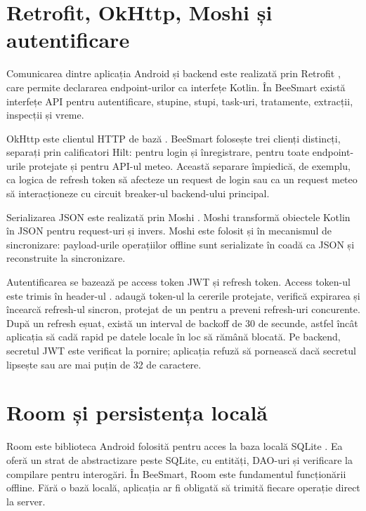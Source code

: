 \section{Retrofit, OkHttp, Moshi și autentificare}

Comunicarea dintre aplicația Android și backend este realizată prin Retrofit \cite{retrofitDocs}, care permite declararea endpoint-urilor ca interfețe Kotlin. În BeeSmart există interfețe API pentru autentificare, stupine, stupi, task-uri, tratamente, extracții, inspecții și vreme.

OkHttp este clientul HTTP de bază \cite{okhttpDocs}. BeeSmart folosește trei clienți distincți, separați prin calificatori Hilt:  pentru login și înregistrare,  pentru toate endpoint-urile protejate și  pentru API-ul meteo. Această separare împiedică, de exemplu, ca logica de refresh token să afecteze un request de login sau ca un request meteo să interacționeze cu circuit breaker-ul backend-ului principal.

Serializarea JSON este realizată prin Moshi \cite{moshiDocs}. Moshi transformă obiectele Kotlin în JSON pentru request-uri și invers. Moshi este folosit și în mecanismul de sincronizare: payload-urile operațiilor offline sunt serializate în coadă ca JSON și reconstruite la sincronizare.

Autentificarea se bazează pe access token JWT și refresh token. Access token-ul este trimis în header-ul  \cite{jwtRfc}.  adaugă token-ul la cererile protejate, verifică expirarea și încearcă refresh-ul sincron, protejat de un  pentru a preveni refresh-uri concurente. După un refresh eșuat, există un interval de backoff de 30 de secunde, astfel încât aplicația să cadă rapid pe datele locale în loc să rămână blocată. Pe backend, secretul JWT este verificat la pornire; aplicația refuză să pornească dacă secretul lipsește sau are mai puțin de 32 de caractere.

\section{Room și persistența locală}

Room este biblioteca Android folosită pentru acces la baza locală SQLite \cite{androidRoomDocs}. Ea oferă un strat de abstractizare peste SQLite, cu entități, DAO-uri și verificare la compilare pentru interogări. În BeeSmart, Room este fundamentul funcționării offline. Fără o bază locală, aplicația ar fi obligată să trimită fiecare operație direct la server.

